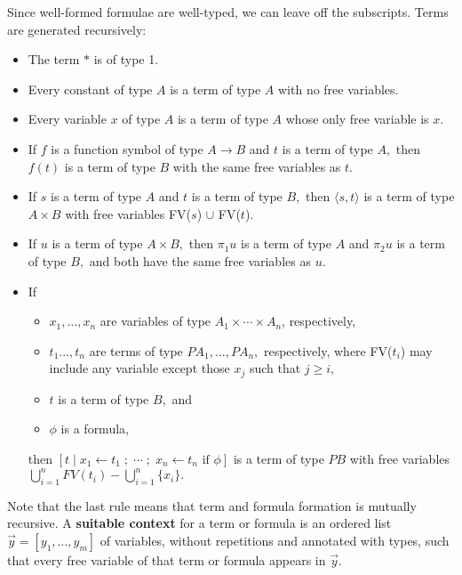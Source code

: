 \documentclass{article}
\begin{document}
Since well-formed formulae are well-typed, we can leave off the subscripts.  Terms are generated recursively:
\begin{itemize}
  \item The term $*$ is of type 1.
  \item Every constant of type $A$ is a term of type $A$ with no free variables.
  \item Every variable $x$ of type $A$ is a term of type $A$ whose only free variable is $x.$
  \item If $f$ is a function symbol of type $A \to B$ and $t$ is a term of type $A,$ then $f(t)$ is a term of type $B$ with the same free variables as $t.$
  \item If $s$ is a term of type $A$ and $t$ is a term of type $B,$ then $\langle s, t\rangle$ is a term of type $A\times B$ with free variables FV($s$) $\cup$ FV($t$).
  \item If $u$ is a term of type $A\times B,$ then $\pi_1u$ is a term of type $A$ and $\pi_2u$ is a term of type $B,$ and both have the same free variables as $u.$
  \item If
    \begin{itemize}
      \item $x_1, \ldots, x_n$ are variables of type $A_1 \times \cdots \times A_n$, respectively,
      \item $t_1 \ldots, t_n$ are terms of type $PA_1, \ldots, PA_n,$ respectively, where FV($t_i$) may include any variable except those $x_j$ such that $j \ge i,$
      \item $t$ is a term of type $B,$ and
      \item $\phi$ is a formula,
    \end{itemize} 
    then $[t \; |\; x_1 \leftarrow t_1 \;;\; \cdots \;;\; x_n \leftarrow t_n \mbox{ if } \phi]$ is a term of type $PB$ with free variables $\bigcup_{i=1}^{n} FV(t_i) - \bigcup_{i=1}^{n} \{ x_i \}.$
\end{itemize}
Note that the last rule means that term and formula formation is mutually recursive.  A {\bf suitable context} for a term or formula is an ordered list $\vec{y} = [y_1, \ldots, y_m]$ of variables, without repetitions and annotated with types, such that every free variable of that term or formula appears in $\vec{y}.$
\end{document}
